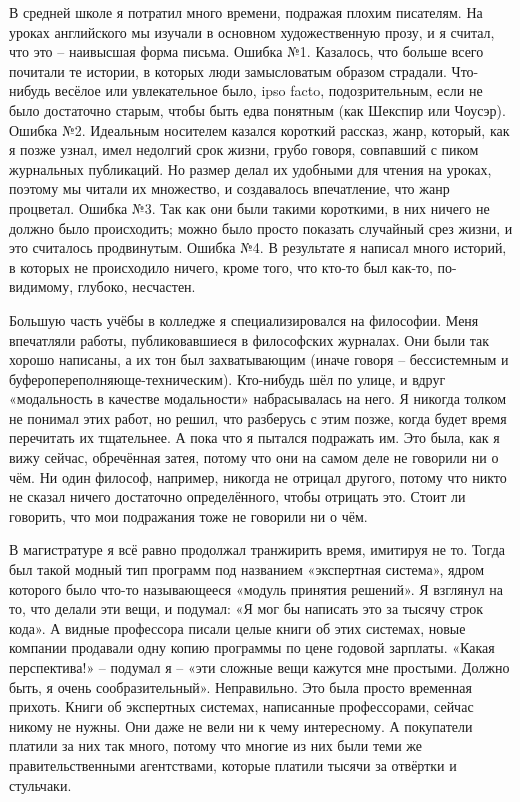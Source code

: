 \documentclass[ebook,12pt,oneside,openany]{memoir}
\date{}
\begin{document}
\maketitle

В средней школе я потратил много времени, подражая плохим писателям.
На уроках английского мы изучали в основном художественную прозу, и я
считал, что это – наивысшая форма письма. Ошибка №1. Казалось, что
больше всего почитали те истории, в которых люди замысловатым образом
страдали. Что-нибудь весёлое или увлекательное было, ipso facto,
подозрительным, если не было достаточно старым, чтобы быть едва
понятным (как Шекспир или Чоусэр). Ошибка №2. Идеальным носителем
казался короткий рассказ, жанр, который, как я позже узнал, имел
недолгий срок жизни, грубо говоря, совпавший с пиком журнальных
публикаций. Но размер делал их удобными для чтения на уроках, поэтому
мы читали их множество, и создавалось впечатление, что жанр процветал.
Ошибка №3. Так как они были такими короткими, в них ничего не должно
было происходить; можно было просто показать случайный срез жизни, и
это считалось продвинутым. Ошибка №4. В результате я написал много
историй, в которых не происходило ничего, кроме того, что кто-то был
как-то, по-видимому, глубоко, несчастен.

Большую часть учёбы в колледже я специализировался на философии. Меня
впечатляли работы, публиковавшиеся в философских журналах. Они были
так хорошо написаны, а их тон был захватывающим (иначе говоря –
бессистемным и буферопереполняюще-техническим). Кто-нибудь шёл по
улице, и вдруг «модальность в качестве модальности» набрасывалась на
него. Я никогда толком не понимал этих работ, но решил, что разберусь
с этим позже, когда будет время перечитать их тщательнее. А пока что я
пытался подражать им. Это была, как я вижу сейчас, обречённая затея,
потому что они на самом деле не говорили ни о чём. Ни один философ,
например, никогда не отрицал другого, потому что никто не сказал
ничего достаточно определённого, чтобы отрицать это. Стоит ли
говорить, что мои подражания тоже не говорили ни о чём.

В магистратуре я всё равно продолжал транжирить время, имитируя не то.
Тогда был такой модный тип программ под названием «экспертная
система», ядром которого было что-то называющееся «модуль принятия
решений». Я взглянул на то, что делали эти вещи, и подумал: «Я мог бы
написать это за тысячу строк кода». А видные профессора писали целые
книги об этих системах, новые компании продавали одну копию программы
по цене годовой зарплаты. «Какая перспектива!» – подумал я – «эти
сложные вещи кажутся мне простыми. Должно быть, я очень
сообразительный». Неправильно. Это была просто временная прихоть.
Книги об экспертных системах, написанные профессорами, сейчас никому
не нужны. Они даже не вели ни к чему интересному. А покупатели платили
за них так много, потому что многие из них были теми же
правительственными агентствами, которые платили тысячи за отвёртки и
стульчаки.
\end{document}

